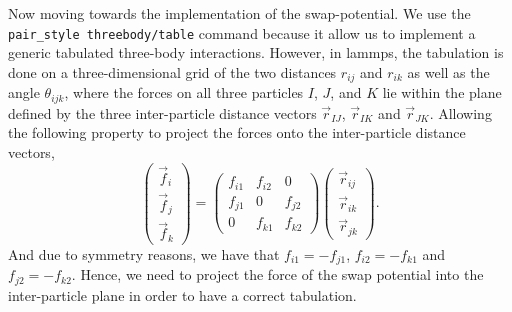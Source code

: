 Now moving towards the implementation of the swap-potential.
We use the \verb|pair_style threebody/table| command because it allow us to implement a generic tabulated three-body interactions.
However, in lammps, the tabulation is done on a three-dimensional grid of the two distances $r_{ij}$ and $r_{ik}$ as well as the angle $\theta_{ijk}$, where the forces on all three particles $I$, $J$, and $K$ lie within the plane defined by the three inter-particle distance vectors $\vec{r}_{IJ}$, $\vec{r}_{IK}$ and $\vec{r}_{JK}$\citep{LAMMPS}.
Allowing the following property to project the forces onto the inter-particle distance vectors,
\begin{equation}
    \begin{pmatrix}\vec{f}_i \\ \vec{f}_j \\ \vec{f}_k\end{pmatrix}
    =
    \begin{pmatrix}f_{i1} & f_{i2} & 0 \\ f_{j1} & 0 & f_{j2} \\ 0 & f_{k1} & f_{k2} \end{pmatrix}
    \begin{pmatrix}\vec{r}_{ij} \\ \vec{r}_{ik} \\ \vec{r}_{jk}\end{pmatrix}.
\end{equation}
And due to symmetry reasons, we have that $f_{i1}=-f_{j1}$, $f_{i2}=-f_{k1}$ and $f_{j2}=-f_{k2}$.
Hence, we need to project the force of the swap potential into the inter-particle plane in order to have a correct tabulation.

